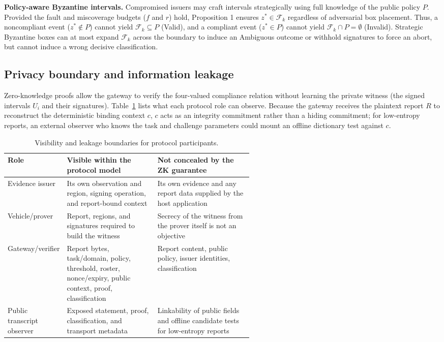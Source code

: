 \textbf{Policy-aware Byzantine intervals.} Compromised issuers may craft intervals strategically using full knowledge of the public policy $P$. Provided the fault and miscoverage budgets ($f$ and $r$) hold, Proposition 1 ensures $z^* \in \mathcal{F}_k$ regardless of adversarial box placement. Thus, a noncompliant event ($z^* \notin P$) cannot yield $\mathcal{F}_k \subseteq P$ (Valid), and a compliant event ($z^* \in P$) cannot yield $\mathcal{F}_k \cap P = \emptyset$ (Invalid). Strategic Byzantine boxes can at most expand $\mathcal{F}_k$ across the boundary to induce an Ambiguous outcome or withhold signatures to force an abort, but cannot induce a wrong decisive classification.

\subsection{Privacy boundary and information leakage}
Zero-knowledge proofs allow the gateway to verify the four-valued compliance relation without learning the private witness (the signed intervals $U_i$ and their signatures). Table~\ref{tab:privacy-boundary} lists what each protocol role can observe. Because the gateway receives the plaintext report $R$ to reconstruct the deterministic binding context $c$, $c$ acts as an integrity commitment rather than a hiding commitment; for low-entropy reports, an external observer who knows the task and challenge parameters could mount an offline dictionary test against $c$.

\begin{table}[htbp]\centering\footnotesize
\caption{Visibility and leakage boundaries for protocol participants.}\label{tab:privacy-boundary}
\begin{tabularx}{\linewidth}{@{}p{0.19\linewidth}p{0.37\linewidth}X@{}}\toprule
Role & Visible within the protocol model & Not concealed by the ZK guarantee\\\midrule
Evidence issuer & Its own observation and region, signing operation, and report-bound context & Its own evidence and any report data supplied by the host application\\
Vehicle/prover & Report, regions, and signatures required to build the witness & Secrecy of the witness from the prover itself is not an objective\\
Gateway/verifier & Report bytes, task/domain, policy, threshold, roster, nonce/expiry, public context, proof, classification & Report content, public policy, issuer identities, classification\\
Public transcript observer & Exposed statement, proof, classification, and transport metadata & Linkability of public fields and offline candidate tests for low-entropy reports\\\bottomrule
\end{tabularx}\end{table}

